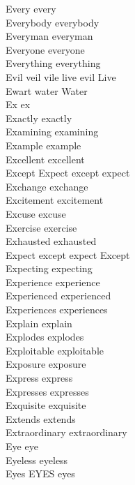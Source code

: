 Every every\\
Everybody everybody\\
Everyman everyman\\
Everyone everyone\\
Everything everything\\
Evil veil vile live evil Live\\
Ewart water Water\\
Ex ex\\
Exactly exactly\\
Examining examining\\
Example example\\
Excellent excellent\\
Except Expect except expect\\
Exchange exchange\\
Excitement excitement\\
Excuse excuse\\
Exercise exercise\\
Exhausted exhausted\\
Expect except expect Except\\
Expecting expecting\\
Experience experience\\
Experienced experienced\\
Experiences experiences\\
Explain explain\\
Explodes explodes\\
Exploitable exploitable\\
Exposure exposure\\
Express express\\
Expresses expresses\\
Exquisite exquisite\\
Extends extends\\
Extraordinary extraordinary\\
Eye eye\\
Eyeless eyeless\\
Eyes EYES eyes\\

